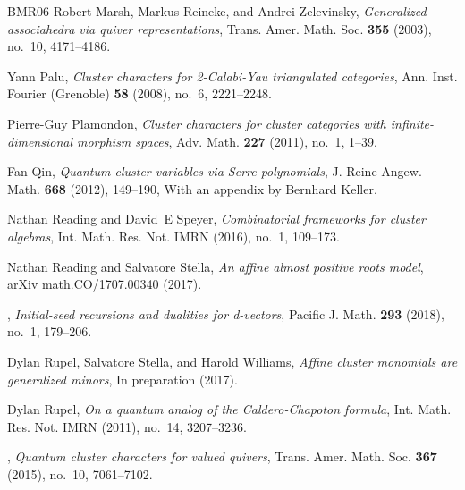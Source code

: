 \documentclass[12pt]{amsart}
\begin{document}
\begin{thebibliography}{BMR{\etalchar{+}}06}
Robert Marsh, Markus Reineke, and Andrei Zelevinsky, \emph{Generalized
  associahedra via quiver representations}, Trans. Amer. Math. Soc.
  \textbf{355} (2003), no.~10, 4171--4186. 

Yann Palu, \emph{Cluster characters for 2-{C}alabi-{Y}au triangulated
  categories}, Ann. Inst. Fourier (Grenoble) \textbf{58} (2008), no.~6,
  2221--2248. 

Pierre-Guy Plamondon, \emph{Cluster characters for cluster categories with
  infinite-dimensional morphism spaces}, Adv. Math. \textbf{227} (2011), no.~1,
  1--39. 

Fan Qin, \emph{Quantum cluster variables via {S}erre polynomials}, J. Reine
  Angew. Math. \textbf{668} (2012), 149--190, With an appendix by Bernhard
  Keller. 

Nathan Reading and David~E Speyer, \emph{Combinatorial frameworks for cluster
  algebras}, Int. Math. Res. Not. IMRN (2016), no.~1, 109--173. 

Nathan Reading and Salvatore Stella, \emph{{An affine almost positive roots
  model}}, arXiv math.CO/1707.00340 (2017).

\bysame, \emph{Initial-seed recursions and dualities for d-vectors}, Pacific J.
  Math. \textbf{293} (2018), no.~1, 179--206. 

Dylan Rupel, Salvatore Stella, and Harold Williams, \emph{Affine cluster
  monomials are generalized minors}, In preparation (2017).

Dylan Rupel, \emph{On a quantum analog of the {C}aldero-{C}hapoton formula},
  Int. Math. Res. Not. IMRN (2011), no.~14, 3207--3236. 

\bysame, \emph{Quantum cluster characters for valued quivers}, Trans. Amer.
  Math. Soc. \textbf{367} (2015), no.~10, 7061--7102. 

\end{thebibliography}
\end{document}
